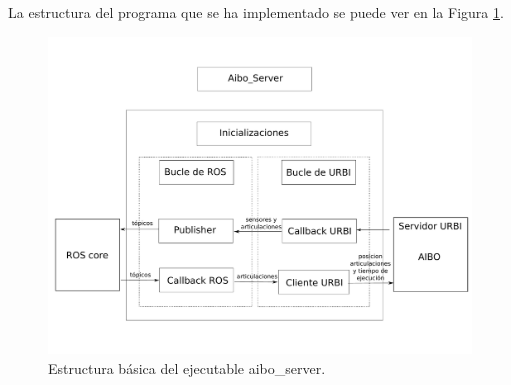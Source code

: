 \documentclass[12pt,a4paper,final,twoside]{book}
\begin{document}
La estructura del programa que se ha implementado se puede ver en la Figura \ref{fig:aiboserver}.
\begin{figure}[H]
	\centering
    \includegraphics[scale=0.35]{images/Aibo_Server.pdf}
	 \caption{Estructura básica del ejecutable aibo{\_}server.}
  \label{fig:aiboserver}
\end{figure}
\end{document}
